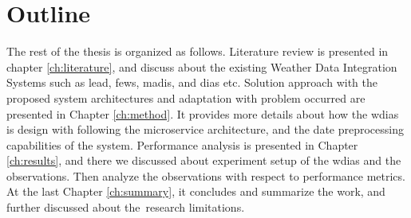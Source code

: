 \section{Outline}
The rest of the thesis is organized as follows. Literature review is presented in chapter \ref{ch:literature}, and discuss about the existing Weather Data Integration Systems such as \acrshort{lead}, \acrshort{fews}, \acrshort{madis}, and \acrshort{dias} etc. Solution approach with the proposed system architectures and adaptation with problem occurred are presented in Chapter \ref{ch:method}. It provides more details about how the \acrshort{wdias} is design with following the microservice architecture, and the date preprocessing capabilities of the system. Performance analysis is presented in Chapter \ref{ch:results}, and there we discussed about experiment setup of the \acrshort{wdias} and the observations. Then analyze the observations with respect to performance metrics. At the last Chapter \ref{ch:summary}, it concludes and summarize the work, and further discussed about the research limitations.
